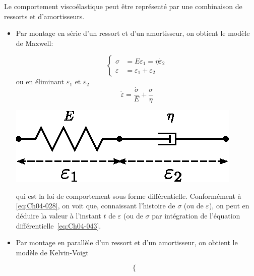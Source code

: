 Le comportement viscoélastique peut être représenté par une combinaison de ressorts et d'amortisseurs. 
\begin{itemize}
    \item Par montage en série d'un ressort et d'un amortisseur, on obtient le modèle de Maxwell:
        \begin{multicols}{2}
            \begin{equation}
                \left\{
                \begin{aligned}
                    \sigma &= E \varepsilon_1 = \eta \dot{\varepsilon}_2 \\
                    \varepsilon &= \varepsilon_1 + \varepsilon_2
                \end{aligned}
                \right.
                \label{eq:Ch04-042}
            \end{equation}
            ou en éliminant $\varepsilon_1$ et $\varepsilon_2$
            \begin{equation}
                \dot \varepsilon = \frac{\dot \sigma}{E} + \frac{\sigma}{\eta}
                \label{eq:Ch04-043}
            \end{equation}
            \columnbreak
            \begin{center}
                \includegraphics{../images/T1_Ch04-0025}
            \end{center}
        \end{multicols}
        qui est la loi de comportement sous forme différentielle.
        Conformément à \eqref{eq:Ch04-028}, on voit que, connaissant l'histoire de $\sigma$ (ou de $\varepsilon$), on peut en déduire la valeur à l'instant $t$ de $\varepsilon$ (ou de $\sigma$ par intégration de l'équation différentielle~\eqref{eq:Ch04-043}.
    \item Par montage en parallèle d'un ressort et d'un amortisseur, on obtient le modèle de Kelvin-Voigt
        \begin{multicols}{2}
            \begin{equation}
                \left\{
                \begin{aligned}

\end{aligned}
\end{equation}
\end{multicols}
\end{itemize}
